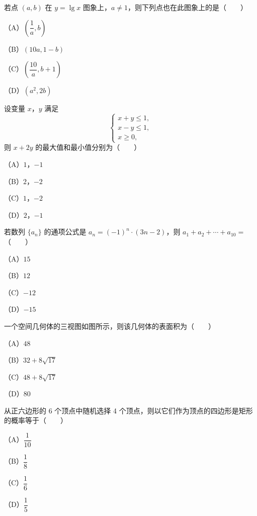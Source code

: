 \begin{question}
若点 $(a,b)$ 在 $y=\lg x$ 图象上，$a\neq1$，则下列点也在此图象上的是\mbox{（　　）}

（A）$\left(\dfrac1a,b\right)$

（B）$(10a,1-b)$

（C）$\left(\dfrac{10}{a},b+1\right)$

（D）$(a^2,2b)$
\end{question}
\begin{question}
设变量 $x$，$y$ 满足
\nopagebreak[4]
\[
\begin{cases}
x+y\leqslant1,\\
x-y\leqslant1,\\
x\geqslant0,
\end{cases}
\]
则 $x+2y$ 的最大值和最小值分别为\mbox{（　　）}

（A）$1$，$-1$

（B）$2$，$-2$

（C）$1$，$-2$

（D）$2$，$-1$
\end{question}
\begin{question}
若数列 $\{a_n\}$ 的通项公式是 $a_n=(-1)^n\cdot(3n-2)$，则 $a_1+a_2+\cdots+a_{10}=$\mbox{（　　）}

（A）$15$

（B）$12$

（C）$-12$

（D）$-15$
\Needspace{0.4\textheight}
\end{question}
\begin{question}
一个空间几何体的三视图如图所示，则该几何体的表面积为\mbox{（　　）}

（A）$48$

（B）$32+8\sqrt{17}$

（C）$48+8\sqrt{17}$

（D）$80$
\nopagebreak[4]
\begin{center}\end{center}
\nopagebreak[4]
\end{question}
\begin{question}
从正六边形的 6 个顶点中随机选择 4 个顶点，则以它们作为顶点的四边形是矩形的概率等于\mbox{（　　）}

（A）$\dfrac1{10}$

（B）$\dfrac18$

（C）$\dfrac16$

（D）$\dfrac15$
\Needspace{0.4\textheight}
\end{question}
